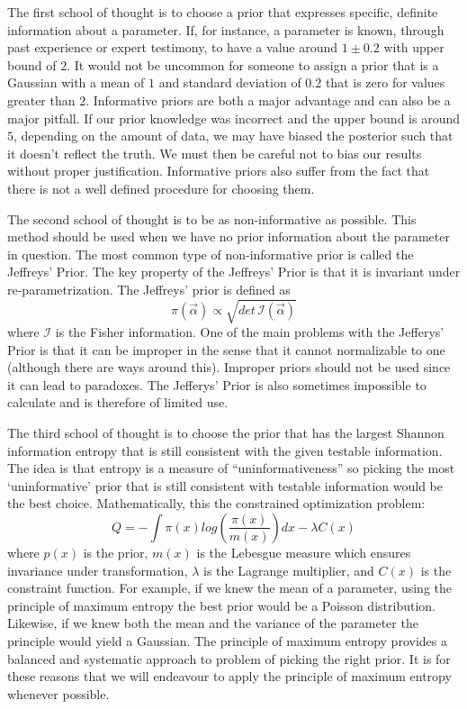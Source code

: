 \documentclass[12pt]{article}
\numberwithin{equation}{section}
\begin{document}
The first school of thought is to choose a prior that expresses specific, definite information about a parameter.
If, for instance, a parameter is known, through past experience or expert testimony, to have a value 
around $1 \pm 0.2$ with upper bound of $2$. It would not be uncommon for someone to assign a prior that is a Gaussian with a mean of 
$1$ and standard deviation of $0.2$ that is zero for values greater than $2$. Informative priors are both a major advantage and can 
also be a major pitfall. If our prior knowledge was incorrect and the upper bound is around $5$, depending on the amount of data, we 
may have biased the posterior such that it doesn't reflect the truth. We must then be careful not to bias our results without proper 
justification. Informative priors also suffer from the fact that there is not a well defined procedure for choosing them. 

The second school of thought is to be as non-informative as possible. This method should 
be used when we have no prior information about the parameter in question. The most common type of non-informative prior 
is called the Jeffreys' Prior. The key property of the Jeffreys' Prior is that it is invariant under re-parametrization. 
The Jeffreys' prior is defined as 
\begin{equation} \label{eq:jefferys}
	\pi(\vec{\alpha}) \propto \sqrt{det \,\mathcal{I}(\vec{\alpha})}
\end{equation}
where $\mathcal{I}$ is the Fisher information. One of the main problems with the Jefferys' Prior is that it can be 
improper in the sense that it cannot normalizable to one (although there are ways around this). Improper priors should 
not be used since it can lead to paradoxes.\cite{von2011bayesian}
The Jefferys' Prior is also sometimes impossible to calculate and is therefore of limited use.

The third school of thought is to choose the prior that has the largest Shannon information entropy that is still consistent with the 
given testable information. The idea is that entropy is a measure of ``uninformativeness'' so picking the most `uninformative' prior 
that is still consistent with testable information would be the best choice. Mathematically, this the constrained optimization 
problem:
\begin{equation} \label{eq:maxent}
	Q = -\int \pi(x) log(\frac{\pi(x)}{m(x)})dx - \lambda C(x) 
\end{equation}
where $p(x)$ is the prior, $m(x)$ is the Lebesgue measure which ensures invariance under transformation, $\lambda$ is the Lagrange 
multiplier, and $C(x)$ is the constraint function. For example, if we knew the mean of a parameter, using the 
principle of maximum entropy the best prior would be a Poisson distribution. Likewise, if we knew both the mean and the variance of 
the parameter the principle would yield a Gaussian. The principle of maximum entropy provides a balanced and systematic approach to 
problem of picking the right prior. It is for these reasons that we will endeavour to apply the principle of maximum entropy 
whenever possible.   
\end{document}
